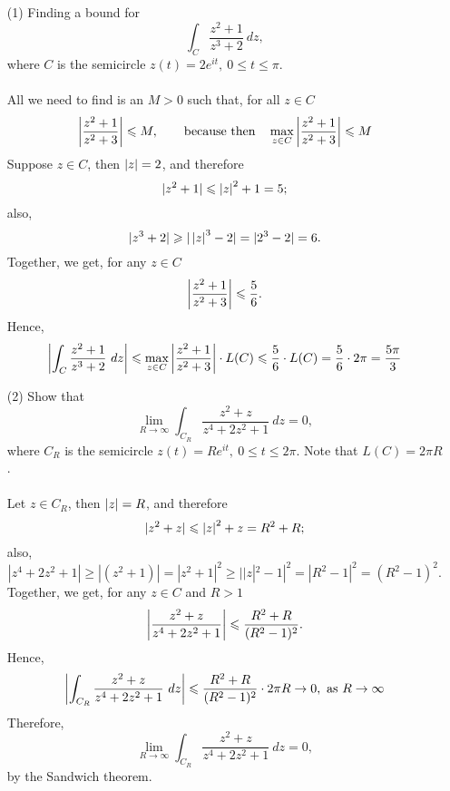 \medskip

\begin{example}\hfill
\begin{itemize}
\item[(1)] Finding a bound for
\[\int_C\frac{z^2 + 1}{z^3 + 2}\ dz,\]
where $C$ is the semicircle $z(t) = 2e^{it},\ 0 \leq t \leq \pi$.\\
\\
All we need to find is an $M > 0$ such that, for all $z \in C$
\[\left\lvert\frac{z^2 + 1}{z^2 + 3}\right\rvert \leqslant M,\qquad \text{because then}\quad\max_{z \in C}\left\lvert\frac{z^2 + 1}{z^2 + 3}\right\rvert \leqslant M\]
Suppose $z \in C$, then $\left\lvert z\right\rvert = 2$, and therefore
\[|z^2 + 1| \leqslant \left\lvert z\right\rvert^2 + 1 = 5;\]
also,
\[|z^3 + 2| \geqslant |\left\lvert z\right\rvert^3 - 2| = |2^3 - 2| = 6.\]
Together, we get, for any $z \in C$
\[\left\lvert\frac{z^2 + 1}{z^2 + 3}\right\rvert \leqslant \frac{5}{6}.\]
Hence, 
\[\left\lvert\int_C\frac{z^2 + 1}{z^3 + 2}\ dz\right\rvert \leqslant \max_{z \in C}\left\lvert\frac{z^2 + 1}{z^2 + 3}\right\rvert\cdot L(C) \leqslant \frac{5}{6}\cdot L(C) = \frac{5}{6}\cdot 2\pi = \frac{5\pi}{3}\]

\item[(2)] Show that
\[\lim_{R \to \infty}\int_{C_R}\frac{z^2 + z}{z^4 + 2z^2 + 1}\ dz = 0,\]
where $C_R$ is the semicircle $z(t) = Re^{it},\ 0 \leq t \leq 2\pi$. Note that $L(C) = 2\pi R$.\\
\\
Let $z \in C_R$, then $\left\lvert z\right\rvert = R$, and therefore
\[|z^2 + z| \leqslant \left\lvert z\right\rvert^2 + z = R^2 + R;\]
also,
\[|z^4 + 2z^2 + 1| \geq |(z^2 + 1)| = |z^2 + 1|^2 \geq ||z|^2 - 1|^2 = |R^2 - 1|^2 = (R^2 - 1)^2.\]
Together, we get, for any $z \in C$ and $R > 1$
\[\left\lvert\frac{z^2 + z}{z^4 + 2z^2 + 1}\right\rvert \leqslant \frac{R^2 + R}{(R^2 - 1)^2}.\]
Hence, 
\[\abs{\int_{C_R}\frac{z^2 + z}{z^4 + 2z^2 + 1}\ dz} \leq \frac{R^2 + R}{(R^2 - 1)^2}\cdot 2\pi R  \to 0,\ \text{as } R \to \infty\]
Therefore,
\[\lim_{R \to \infty}\int_{C_R}\frac{z^2 + z}{z^4 + 2z^2 + 1}\ dz = 0,\]
by the Sandwich theorem.
\end{itemize}
\end{example}

\medskip

